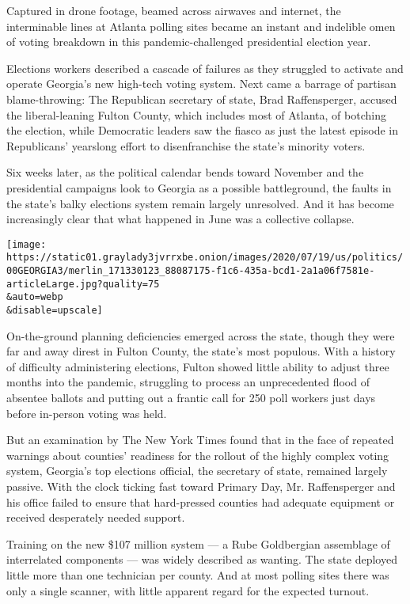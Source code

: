 Captured in drone footage, beamed across airwaves and internet, the
interminable lines at Atlanta polling sites became an instant and
indelible omen of voting breakdown in this pandemic-challenged
presidential election year.

Elections workers described a cascade of failures as they struggled to
activate and operate Georgia's new high-tech voting system. Next came a
barrage of partisan blame-throwing: The Republican secretary of state,
Brad Raffensperger, accused the liberal-leaning Fulton County, which
includes most of Atlanta, of botching the election, while Democratic
leaders saw the fiasco as just the latest episode in Republicans'
yearslong effort to disenfranchise the state's minority voters.

Six weeks later, as the political calendar bends toward November and the
presidential campaigns look to Georgia as a possible battleground, the
faults in the state's balky elections system remain largely unresolved.
And it has become increasingly clear that what happened in June was a
collective collapse.

\texttt{[image: https://static01.graylady3jvrrxbe.onion/images/2020/07/19/us/politics/00GEORGIA3/merlin\_171330123\_88087175-f1c6-435a-bcd1-2a1a06f7581e-articleLarge.jpg?quality=75\\\&auto=webp\\\&disable=upscale]}

On-the-ground planning deficiencies emerged across the state, though
they were far and away direst in Fulton County, the state's most
populous. With a history of difficulty administering elections, Fulton
showed little ability to adjust three months into the pandemic,
struggling to process an unprecedented flood of absentee ballots and
putting out a frantic call for 250 poll workers just days before
in-person voting was held.

But an examination by The New York Times found that in the face of
repeated warnings about counties' readiness for the rollout of the
highly complex voting system, Georgia's top elections official, the
secretary of state, remained largely passive. With the clock ticking
fast toward Primary Day, Mr. Raffensperger and his office failed to
ensure that hard-pressed counties had adequate equipment or received
desperately needed support.

Training on the new \$107 million system --- a Rube Goldbergian
assemblage of interrelated components --- was widely described as
wanting. The state deployed little more than one technician per county.
And at most polling sites there was only a single scanner, with little
apparent regard for the expected turnout.

